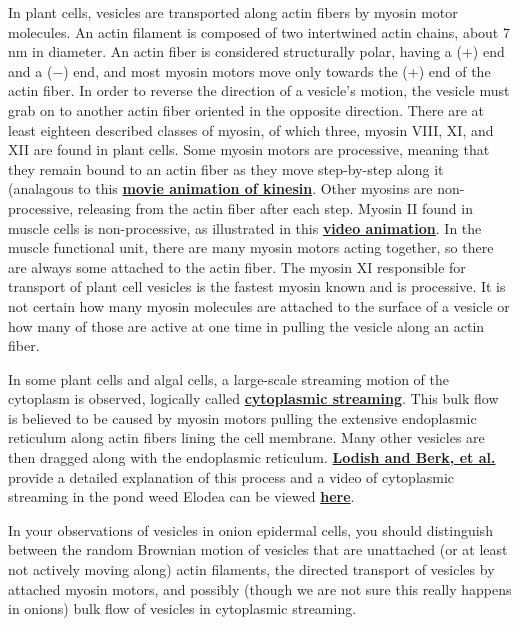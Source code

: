 \documentclass{../lab}
\begin{document}
In plant cells, vesicles are transported along actin fibers by myosin motor molecules. An actin filament is composed of two intertwined actin chains, about 7 nm in diameter. An actin fiber is considered structurally polar, having a (+) end and a ($-$) end, and most myosin motors move only towards the (+) end of the actin fiber. In order to reverse the direction of a vesicle's motion, the vesicle must grab on to another actin fiber oriented in the opposite direction. There are at least eighteen described classes of myosin, of which three, myosin VIII, XI, and XII are found in plant cells. Some myosin motors are processive, meaning that they remain bound to an actin fiber as they move step-by-step along it (analagous to this \href{https://vimeo.com/157524451}{\textbf{movie animation of kinesin}}. Other myosins are non-processive, releasing from the actin fiber after each step. Myosin II found in muscle cells is non-processive, as illustrated in this \href{http://www.banyantree.org/jsale/actinmyosin/index.html}{\textbf{video animation}}. In the muscle functional unit, there are many myosin motors acting together, so there are always some attached to the actin fiber. The myosin XI responsible for transport of plant cell vesicles is the fastest myosin known and is processive. It is not certain how many myosin molecules are attached to the surface of a vesicle or how many of those are active at one time in pulling the vesicle along an actin fiber.

In some plant cells and algal cells, a large-scale streaming motion of the cytoplasm is observed, logically called \href{http://en.wikipedia.org/wiki/Cytoplasmic\_streaming}{\textbf{cytoplasmic streaming}}. This bulk flow is believed to be caused by myosin motors pulling the extensive endoplasmic reticulum along actin fibers lining the cell membrane. Many other vesicles are then dragged along with the endoplasmic reticulum. \href{http://www.ncbi.nlm.nih.gov/books/bv.fcgi?rid=mcb.figgrp.5242}{\textbf{Lodish and Berk, et al.}} provide a detailed explanation of this process and a video of cytoplasmic streaming in the pond weed Elodea can be viewed \href{http://www.microscopy-uk.org.uk/mag/imgnov00/cycloa3i.avi}{\textbf{here}}.

In your observations of vesicles in onion epidermal cells, you should distinguish between the random Brownian motion of vesicles that are unattached (or at least not actively moving along) actin filaments, the directed transport of vesicles by attached myosin motors, and possibly (though we are not sure this really happens in onions) bulk flow of vesicles in cytoplasmic streaming.
\end{document}
